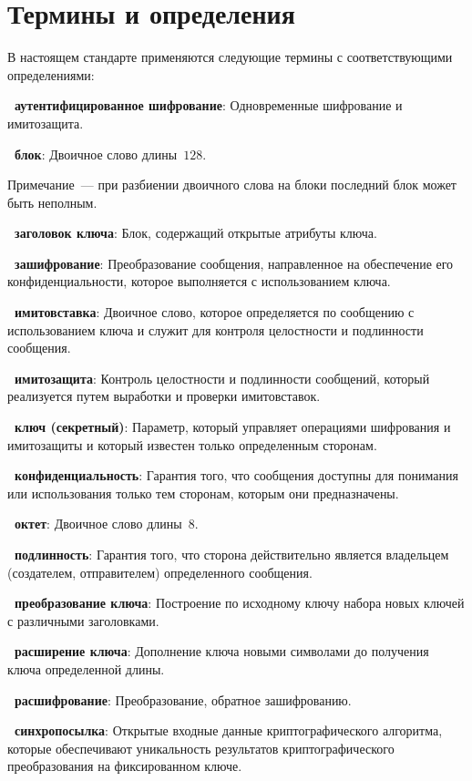 \chapter{Термины и определения}

В настоящем стандарте применяются  
следующие термины с соответствующими определениями:

{\bf \thedefctr~аутентифицированное шифрование}:
Одновременные шифрование и имитозащита.

{\bf \thedefctr~блок}:
Двоичное слово длины~$128$.

\begin{note}
Примечание~--- при разбиении двоичного слова на блоки последний блок
может быть неполным.
\end{note}

{\bf \thedefctr~заголовок ключа}:
Блок, содержащий открытые атрибуты ключа.

{\bf \thedefctr~зашифрование}:
Преобразование сообщения,
направленное на обеспечение его конфиденциальности,
которое выполняется с использованием ключа.

{\bf \thedefctr~имитовставка}:
Двоичное слово, 
которое определяется по сообщению с использованием ключа 
и служит для контроля целостности и подлинности сообщения.

{\bf \thedefctr~имитозащита}:
Контроль целостности и подлинности сообщений, 
который реализуется путем выработки и проверки имитовставок.

{\bf \thedefctr~ключ (секретный)}:
Параметр, который управляет операциями шифрования 
и имитозащиты и который известен только определенным сторонам.

{\bf \thedefctr~конфиденциальность}:
Гарантия того, что сообщения доступны для понимания или использования
только тем сторонам, которым они предназначены.

{\bf \thedefctr~октет}:
Двоичное слово длины~$8$.

{\bf \thedefctr~подлинность}:
Гарантия того, что сторона действительно является
владельцем (создателем, отправителем) определенного сообщения.

{\bf \thedefctr~преобразование ключа}:
Построение по исходному ключу набора новых ключей 
с различными заголовками.

{\bf \thedefctr~расширение ключа}:
Дополнение ключа новыми символами до получения ключа определенной длины.

{\bf \thedefctr~расшифрование}:
Преобразование, обратное зашифрованию.

{\bf \thedefctr~синхропосылка}:
Открытые входные данные криптографического алгоритма,
которые обеспечивают уникальность результатов 
криптографического преобразования на фиксированном ключе.

